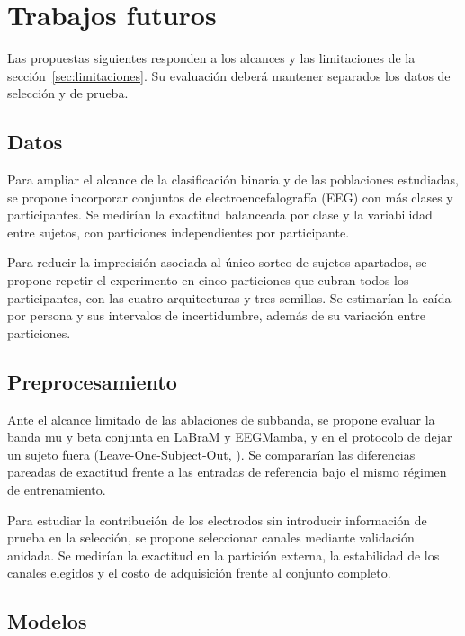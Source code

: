 \chapter{Trabajos futuros}
\label{cap:trabajos-futuros}
Las propuestas siguientes responden a los alcances y las limitaciones de la sección~\ref{sec:limitaciones}. Su evaluación deberá mantener separados los datos de selección y de prueba.

\section{Datos}
\label{sec:tf-datos}

Para ampliar el alcance de la clasificación binaria y de las poblaciones estudiadas, se propone incorporar conjuntos de electroencefalografía (EEG) con más clases y participantes. Se medirían la exactitud balanceada por clase y la variabilidad entre sujetos, con particiones independientes por participante.

Para reducir la imprecisión asociada al único sorteo de sujetos apartados, se propone repetir el experimento en cinco particiones que cubran todos los participantes, con las cuatro arquitecturas y tres semillas. Se estimarían la caída por persona y sus intervalos de incertidumbre, además de su variación entre particiones.

\section{Preprocesamiento}
\label{sec:tf-preprocesamiento}

Ante el alcance limitado de las ablaciones de subbanda, se propone evaluar la banda mu y beta conjunta en LaBraM y EEGMamba, y en el protocolo de dejar un sujeto fuera (Leave-One-Subject-Out, \loso{}). Se compararían las diferencias pareadas de exactitud frente a las entradas de referencia bajo el mismo régimen de entrenamiento.

Para estudiar la contribución de los electrodos sin introducir información de prueba en la selección, se propone seleccionar canales mediante validación anidada. Se medirían la exactitud en la partición externa, la estabilidad de los canales elegidos y el costo de adquisición frente al conjunto completo.

\section{Modelos}
\label{sec:tf-modelos}

